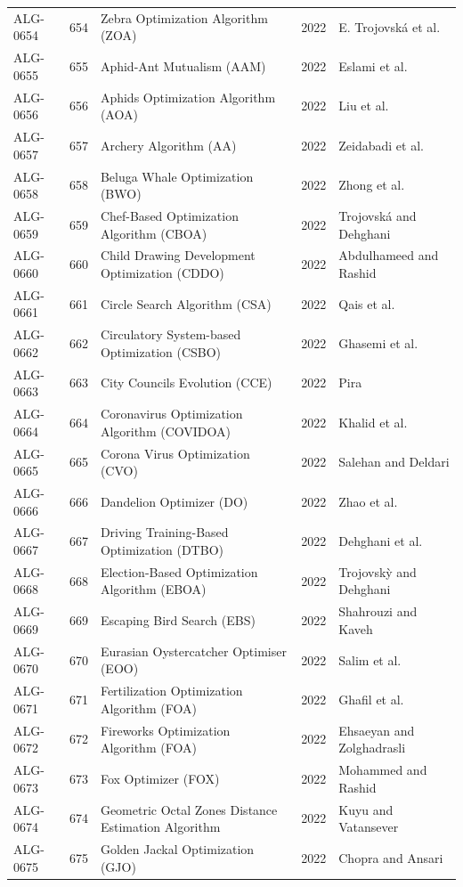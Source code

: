 \documentclass[8pt]{article}
\begin{document}
\begin{landscape}
\begin{longtable}{P{1.7cm}rP{10.0cm}rP{7.2cm}}
ALG-0654 & 654 & Zebra Optimization Algorithm (ZOA) & 2022 & E. Trojovská et al. \\
ALG-0655 & 655 & Aphid-Ant Mutualism (AAM) & 2022 & Eslami et al. \\
ALG-0656 & 656 & Aphids Optimization Algorithm (AOA) & 2022 & Liu et al. \\
ALG-0657 & 657 & Archery Algorithm (AA) & 2022 & Zeidabadi et al. \\
ALG-0658 & 658 & Beluga Whale Optimization (BWO) & 2022 & Zhong et al. \\
ALG-0659 & 659 & Chef-Based Optimization Algorithm (CBOA) & 2022 & Trojovská and Dehghani \\
ALG-0660 & 660 & Child Drawing Development Optimization (CDDO) & 2022 & Abdulhameed and Rashid \\
ALG-0661 & 661 & Circle Search Algorithm (CSA) & 2022 & Qais et al. \\
ALG-0662 & 662 & Circulatory System-based Optimization (CSBO) & 2022 & Ghasemi et al. \\
ALG-0663 & 663 & City Councils Evolution (CCE) & 2022 & Pira \\
ALG-0664 & 664 & Coronavirus Optimization Algorithm (COVIDOA) & 2022 & Khalid et al. \\
ALG-0665 & 665 & Corona Virus Optimization (CVO) & 2022 & Salehan and Deldari \\
ALG-0666 & 666 & Dandelion Optimizer (DO) & 2022 & Zhao et al. \\
ALG-0667 & 667 & Driving Training-Based Optimization (DTBO) & 2022 & Dehghani et al. \\
ALG-0668 & 668 & Election-Based Optimization Algorithm (EBOA) & 2022 & Trojovskỳ and Dehghani \\
ALG-0669 & 669 & Escaping Bird Search (EBS) & 2022 & Shahrouzi and Kaveh \\
ALG-0670 & 670 & Eurasian Oystercatcher Optimiser (EOO) & 2022 & Salim et al. \\
ALG-0671 & 671 & Fertilization Optimization Algorithm (FOA) & 2022 & Ghafil et al. \\
ALG-0672 & 672 & Fireworks Optimization Algorithm (FOA) & 2022 & Ehsaeyan and Zolghadrasli \\
ALG-0673 & 673 & Fox Optimizer (FOX) & 2022 & Mohammed and Rashid \\
ALG-0674 & 674 & Geometric Octal Zones Distance Estimation Algorithm & 2022 & Kuyu and Vatansever \\
ALG-0675 & 675 & Golden Jackal Optimization (GJO) & 2022 & Chopra and Ansari \\

\end{longtable}
\end{landscape}
\end{document}
